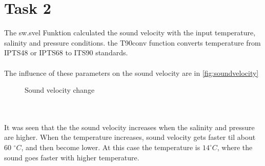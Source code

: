 \section*{Task 2}
The sw.svel Funktion calculated the sound velocity with the input temperature, salinity and pressure conditions. the T90conv function converts temperature from IPTS48 or IPTS68 to ITS90 standards.\\\\
The influence of these parameters on the sound velocity are in \autoref{fig:soundvelocity}
\begin{figure}[ht]\centering
	\caption{Sound velocity change}
	\label{fig:soundvelocity}
\end{figure}\\\\
It was seen that the the sound velocity increases when the salinity and pressure are higher. When the temperature increases, sound velocity gets faster til about 60 $^\circ C$, and then become lower. At this case the temperature is $14 ^\circ C$, where the sound goes faster with higher temperature.
